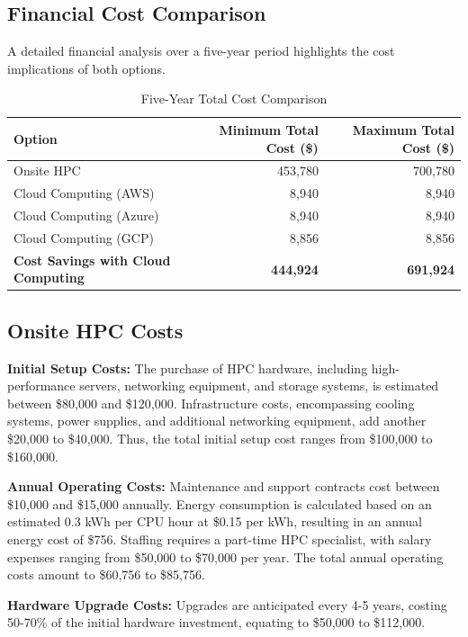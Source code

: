 \documentclass{article}
\begin{document}
\subsection{Financial Cost Comparison}
A detailed financial analysis over a five-year period highlights the cost implications of both options.

\begin{table}[H]
    \centering
    \caption{Five-Year Total Cost Comparison}
    \label{tab:total_cost_comparison}
    \begin{tabular}{lrr}
    \toprule
    \textbf{Option} & \textbf{Minimum Total Cost (\$)} & \textbf{Maximum Total Cost (\$)} \\
    \midrule
    Onsite HPC & 453,780 & 700,780 \\
    Cloud Computing (AWS) & 8,940 & 8,940 \\
    Cloud Computing (Azure) & 8,940 & 8,940 \\
    Cloud Computing (GCP) & 8,856 & 8,856 \\
    \midrule
    \textbf{Cost Savings with Cloud Computing} & \textbf{444,924} & \textbf{691,924} \\
    \bottomrule
    \end{tabular}
    \end{table}


\subsection{Onsite HPC Costs}
\textbf{Initial Setup Costs:}
The purchase of HPC hardware, including high-performance servers, networking equipment, and storage systems, is estimated between \$80,000 and \$120,000. Infrastructure costs, encompassing cooling systems, power supplies, and additional networking equipment, add another \$20,000 to \$40,000. Thus, the total initial setup cost ranges from \$100,000 to \$160,000.

\textbf{Annual Operating Costs:}
Maintenance and support contracts cost between \$10,000 and \$15,000 annually. Energy consumption is calculated based on an estimated 0.3 kWh per CPU hour at \$0.15 per kWh, resulting in an annual energy cost of \$756. Staffing requires a part-time HPC specialist, with salary expenses ranging from \$50,000 to \$70,000 per year. The total annual operating costs amount to \$60,756 to \$85,756.

\textbf{Hardware Upgrade Costs:}
Upgrades are anticipated every 4-5 years, costing 50-70\% of the initial hardware investment, equating to \$50,000 to \$112,000.
\end{document}
